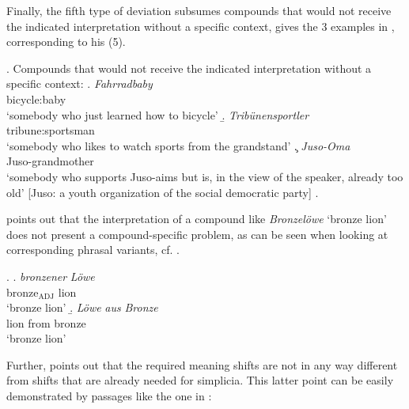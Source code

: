 Finally, the fifth type of deviation subsumes compounds that would not receive the indicated interpretation
without a specific context, \citet[143]{Fanselow:1981} gives the 3
examples in \Next, corresponding to his (5). 

\ex. %
Compounds that would not receive the indicated interpretation
without a specific context:
\a. \gll
\emph{Fahrradbaby}\\
bicycle:baby\\
`somebody who just learned how to bicycle'  
\b. \gll
\emph{Tribünen\-sportler}\\
tribune:sportsman\\
`somebody who likes to watch sports from the grandstand'
\c. \gll
\emph{Juso-Oma}\\
Juso-grandmother \\
`somebody who supports Juso-aims but is,
in the view of the speaker, already too old' [Juso: a youth organization of the social democratic party] 
\z.

\citet[144]{Fanselow:1981} points out that the interpretation of a compound like \emph{Bronze\-löwe} `bronze lion'
does not present a compound-specific problem, as can be seen when looking at corresponding phrasal variants, cf. \Next.

\ex. \a. \gll
\emph{bronzener} \emph{Löwe}\\
bronze$_{\text{ADJ}}$ lion\\
`bronze lion'
\b. \gll
\emph{Löwe} \emph{aus} \emph{Bronze}\\
lion from bronze\\
`bronze lion'

Further, \citet[144]{Fanselow:1981} points out that the required meaning shifts are not in any
way different from shifts that are already needed for simplicia. This
latter point can be easily demonstrated by passages like the one in \Next:
\pagebreak[4]

